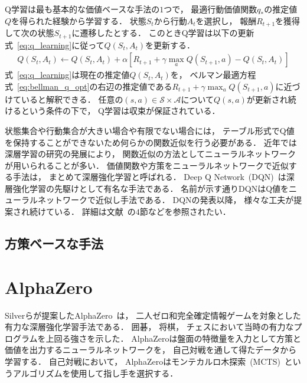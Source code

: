 Q学習は最も基本的な価値ベースな手法の$1$つで， 最適行動価値関数$q_*$の推定値$Q$を得られた経験から学習する．
状態$S_t$から行動$A_t$を選択し， 報酬$R_{t+1}$を獲得して次の状態$S_{t+1}$に遷移したとする．
このときQ学習は以下の更新式~\ref{eq:q_learning}に従って$Q(S_t, A_t)$を更新する．
\begin{align}
  \label{eq:q_learning}
  Q(S_t, A_t) \leftarrow Q(S_t, A_t) + \alpha [R_{t+1} + \gamma \max_a Q(S_{t+1}, a) - Q(S_t, A_t)] 
\end{align}
式~\ref{eq:q_learning}は現在の推定値$Q(S_t, A_t)$を， ベルマン最適方程式~\ref{eq:bellman_q_opt}の右辺の推定値である$R_{t+1} + \gamma \max_a Q(S_{t+1}, a)$に近づけていると解釈できる．
任意の$(s, a) \in \mathcal{S} \times \mathcal{A}$について$Q(s,a)$が更新され続けるという条件の下で， Q学習は収束が保証されている．

状態集合や行動集合が大きい場合や有限でない場合には， テーブル形式でQ値を保持することができないため何らかの関数近似を行う必要がある．
近年では深層学習の研究の発展により， 関数近似の方法としてニューラルネットワークが用いられることが多い．
価値関数や方策をニューラルネットワークで近似する手法は， まとめて深層強化学習と呼ばれる．
Deep Q Network~(DQN)~\cite{DQN}は深層強化学習の先駆けとして有名な手法である． 
名前が示す通りDQNはQ値をニューラルネットワークで近似し手法である．
DQNの発表以降， 様々な工夫が提案され続けている．
詳細は文献~\cite{deepRL}の$4$節などを参照されたい．

\subsection{方策ベースな手法}

\section{AlphaZero}
Silverらが提案したAlphaZero~\cite{AlphaZero}は， 二人ゼロ和完全確定情報ゲームを対象とした有力な深層強化学習手法である．
囲碁， 将棋， チェスにおいて当時の有力なプログラムを上回る強さを示した．
AlphaZeroは盤面の特徴量を入力として方策と価値を出力するニューラルネットワークを， 自己対戦を通して得たデータから学習する．
自己対戦において， AlphaZeroはモンテカルロ木探索~(MCTS)~というアルゴリズムを使用して指し手を選択する．


